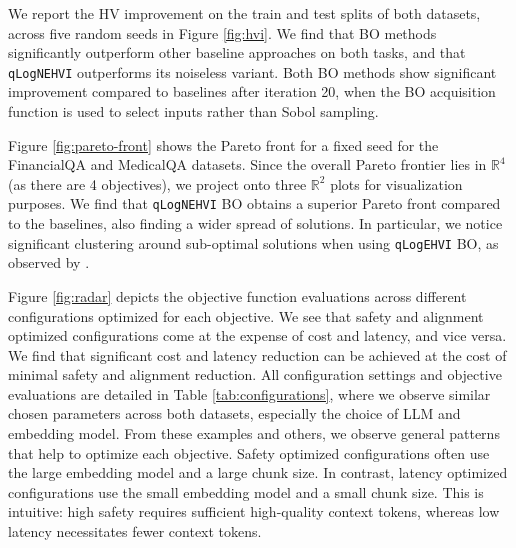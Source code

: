 We report the HV improvement on the train and test splits of both datasets, across five random seeds in Figure \ref{fig:hvi}. We find that BO methods significantly outperform other baseline approaches on both tasks, and that \texttt{qLogNEHVI} outperforms its noiseless variant. 
Both BO methods show significant improvement compared to baselines after iteration 20, when the BO acquisition function is used to select inputs rather than Sobol sampling. %

Figure \ref{fig:pareto-front} shows the Pareto front for a fixed seed for the FinancialQA and MedicalQA datasets. Since the overall Pareto frontier lies in $\mathbb{R}^4$ (as there are 4 objectives), we project onto three $\mathbb{R}^2$ plots for visualization purposes. We find that \texttt{qLogNEHVI} BO obtains a superior Pareto front compared to the baselines, also finding a wider spread of solutions. In particular, we notice significant clustering around sub-optimal solutions when using \texttt{qLogEHVI} BO, as observed by \cite{daulton2021parallel}.

Figure \ref{fig:radar} depicts the objective function evaluations across different configurations optimized for each objective. We see that safety and alignment optimized configurations come at the expense of cost and latency, and vice versa. We find that significant cost and latency reduction can be achieved at the cost of minimal safety and alignment reduction. All configuration settings and objective evaluations are detailed in Table \ref{tab:configurations}, where we observe similar chosen parameters across both datasets, especially the choice of LLM and embedding model. From these examples and others, we observe general patterns that help to optimize each objective. Safety optimized configurations often use the large embedding model and a large chunk size. In contrast, latency optimized configurations use the small embedding model and a small chunk size. This is intuitive: high safety requires sufficient high-quality context tokens, whereas low latency necessitates fewer context tokens. 